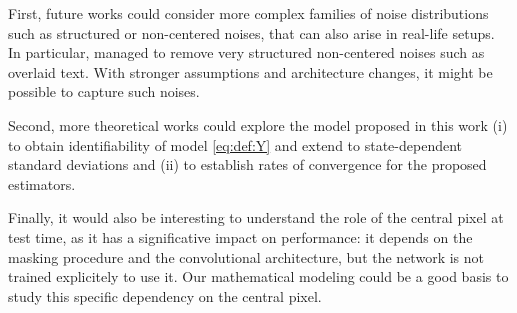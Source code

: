 \documentclass{article}
\begin{document}
First, future works could consider more complex families of noise distributions  such as structured or non-centered noises, that can also arise in real-life setups. In particular, \cite{lehtinen2018noise2noise} managed to remove very structured non-centered noises such as overlaid text. With stronger assumptions and architecture changes, it might be possible to capture such noises.

Second, more theoretical works could explore the model proposed in this work  (i) to obtain identifiability of model \eqref{eq:def:Y} and extend \cite{gassiat:lecorff:lehericy:2021} to state-dependent standard deviations and (ii) to establish rates of convergence for the proposed estimators.

Finally, it would also be interesting to understand the role of the central pixel at test time, as it has a significative impact on performance: it depends on the  masking procedure and the convolutional architecture, but the network is not trained explicitely to use it. Our mathematical modeling could be a good basis to study this specific dependency on the central pixel.

{\small


}
\end{document}
